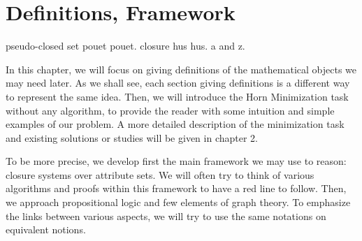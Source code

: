 \chapter{Definitions, Framework}
\gls{pseudo-closed set} pouet pouet. \gls{closure} hus hus. \gls{a} and 
\gls{z}.

In this chapter, we will focus on giving definitions of the mathematical 
objects we may need later. As we shall see, each section giving definitions is 
a different way to represent the same idea. Then, we will introduce the Horn 
Minimization task without any algorithm, to provide the reader with some 
intuition and simple examples of our problem. A more detailed description of 
the minimization task and existing solutions or studies will be given in 
chapter 2. 

\vspace{1.2em}

To be more precise, we develop first the main framework we may use to reason:
closure systems over attribute sets. We will often try to think of various 
algorithms and proofs within this framework to have a red line to follow. Then,
we approach propositional logic and few elements of graph theory. To emphasize
the links between various aspects, we will try to use the same notations on 
equivalent notions. 










